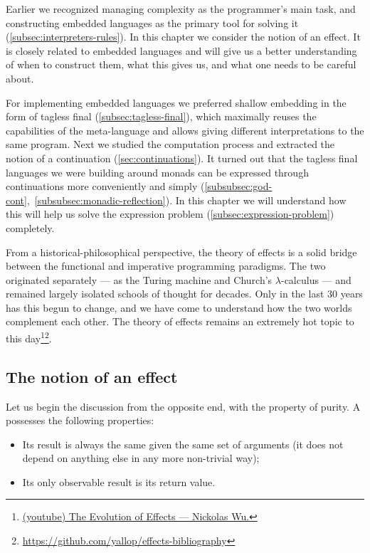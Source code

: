 
Earlier we recognized managing complexity as the programmer's main task, and constructing embedded languages as the primary tool for solving it (\ref{subsec:interpreters-rules}).
In this chapter we consider the notion of an effect.
It is closely related to embedded languages and will give us a better understanding of when to construct them, what this gives us, and what one needs to be careful about.

For implementing embedded languages we preferred shallow embedding in the form of tagless final (\ref{subsec:tagless-final}), which maximally reuses the capabilities of the meta-language and allows giving different interpretations to the same program.
Next we studied the computation process and extracted the notion of a continuation (\ref{sec:continuations}).
It turned out that the tagless final languages we were building around monads can be expressed through continuations more conveniently and simply (\ref{subsubsec:god-cont},\ \ref{subsubsec:monadic-reflection}).
In this chapter we will understand how this will help us solve the expression problem (\ref{subsec:expression-problem}) completely.

From a historical-philosophical perspective, the theory of effects is a solid bridge between the functional and imperative programming paradigms.
The two originated separately --- as the Turing machine and Church's $\lambda$-calculus --- and remained largely isolated schools of thought for decades.
Only in the last 30 years has this begun to change, and we have come to understand how the two worlds complement each other.
The theory of effects remains an extremely hot topic to this day\footnote{\href{https://youtu.be/m821Vz8N_bo?si=HQTDfs52vYKaBcqJ}{(youtube) The Evolution of Effects --- Nickolas Wu.}}\footnote{\url{https://github.com/yallop/effects-bibliography}}.

\subsection{The notion of an effect} \label{subsec:about-effects}

Let us begin the discussion from the opposite end, with the property of purity.
A  possesses the following properties:
\begin{itemize}
    \item Its result is always the same given the same set of arguments (it does not depend on anything else in any more non-trivial way);
    \item Its only observable result is its return value.
\end{itemize}


